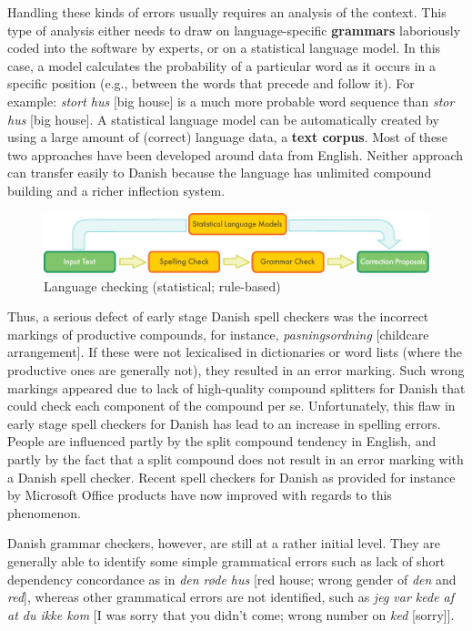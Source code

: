\begin{multicols}{2}
Handling these kinds of errors usually requires an analysis of the context. 
This type of analysis either needs to draw on language-specific \textbf{grammars} laboriously coded into the software by experts, or on a statistical language model. In this case, a model calculates the probability of a particular word as it occurs in a specific position (e.g., between the words that precede and follow it). For example: \textit{stort hus} [big house] is a much more probable word sequence than \textit{stor hus} [big house]. A statistical language model can be automatically created by using a large amount of (correct) language data, a \textbf{text corpus}. Most of these two approaches have been developed around data from English. Neither approach can transfer easily to Danish because the language has unlimited compound building and a richer inflection system.
\begin{figure}[htb]
  \center
  \includegraphics[width=\textwidth]{../_media/english/language_checking}
  \caption{Language checking (statistical; rule-based)}
  \label{fig:langcheckingaarch_en}
\end{figure}
Thus, a serious defect of early stage Danish spell checkers was the incorrect markings of productive compounds, for instance, {\it pasningsordning} [childcare arrangement]. If these were not lexicalised in dictionaries or word lists (where the productive ones are generally not), they resulted in an error marking. Such wrong markings appeared due to lack of high-quality compound splitters for Danish that could check each component of the compound per se. Unfortunately, this flaw in early stage spell checkers for Danish has lead to an increase in spelling errors. People are influenced partly by the split compound tendency in English, and partly by the fact that a split compound does not result in an error marking with a Danish spell checker. Recent spell checkers for Danish as provided for instance by Microsoft Office products have now improved with regards to this phenomenon. 

Danish grammar checkers, however, are still at a rather initial level. They are generally able to identify some simple grammatical errors such as lack of short dependency concordance as in {\it *den r\o de hus} [red house; wrong gender of {\it den} and {\it red}], whereas other grammatical errors are not identified, such as {\it *jeg var kede af at du ikke kom} [I was sorry that you didn't come; wrong number on {\it ked} [sorry]]. 


\end{multicols}
